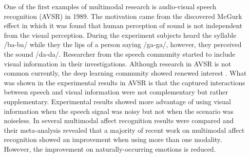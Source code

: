One of the first examples of multimodal research is audio-visual speech recognition (AVSR) in 1989. The motivation came from the discovered McGurk effect in which it was found that human perception of sound is not independent from the visual perception. During the experiment subjects heard the syllable /ba-ba/ while they the lips of a person saying /ga-ga/, however, they perceived the sound /da-da/. Researcher from the speech community started to include visual information in their investigations. Although research in AVSR is not common currently, the deep learning community showed renewed interest \cite{Ngiam2011}. What was shown in the experimental results in AVSR is that the captured interactions between speech and visual information were not complementary but rather supplementary. Experimental results showed more advantage of using visual information when the speech signal was noisy but not when the scenario was noiseless.
In \cite{Dmello2015review} several multimodal affect recognition results were compared and their meta-analysis revealed that a majority of recent work on multimodal affect recognition showed an improvement when using more than one modality. However, the improvement on naturally-occurring emotions is reduced. 

